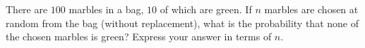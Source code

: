 There are $100$ marbles in a bag, $10$ of which are green. If $n$ marbles are chosen at random from the bag (without replacement), what is the probability that none of the chosen marbles is green? Express your answer in terms of $n$.
